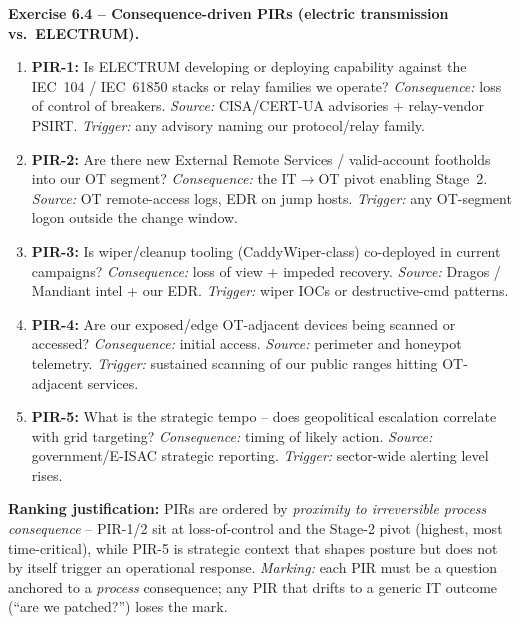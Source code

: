 \documentclass[11pt,a4paper]{article}
\begin{document}
\begin{solutionbox}
\textbf{Exercise 6.4 -- Consequence-driven PIRs (electric transmission vs.\ ELECTRUM).}\\[2pt]
\begin{enumerate}\setlength{\itemsep}{1pt}
  \item \textbf{PIR-1:} Is ELECTRUM developing or deploying capability against the IEC~104 /
        IEC~61850 stacks or relay families we operate? \emph{Consequence:} loss of control of
        breakers. \emph{Source:} CISA/CERT-UA advisories + relay-vendor PSIRT.
        \emph{Trigger:} any advisory naming our protocol/relay family.
  \item \textbf{PIR-2:} Are there new External Remote Services / valid-account footholds into
        our OT segment? \emph{Consequence:} the IT$\to$OT pivot enabling Stage~2.
        \emph{Source:} OT remote-access logs, EDR on jump hosts. \emph{Trigger:} any OT-segment
        logon outside the change window.
  \item \textbf{PIR-3:} Is wiper/cleanup tooling (CaddyWiper-class) co-deployed in current
        campaigns? \emph{Consequence:} loss of view + impeded recovery. \emph{Source:} Dragos /
        Mandiant intel + our EDR. \emph{Trigger:} wiper IOCs or destructive-cmd patterns.
  \item \textbf{PIR-4:} Are our exposed/edge OT-adjacent devices being scanned or accessed?
        \emph{Consequence:} initial access. \emph{Source:} perimeter and honeypot telemetry.
        \emph{Trigger:} sustained scanning of our public ranges hitting OT-adjacent services.
  \item \textbf{PIR-5:} What is the strategic tempo -- does geopolitical escalation correlate
        with grid targeting? \emph{Consequence:} timing of likely action. \emph{Source:}
        government/E-ISAC strategic reporting. \emph{Trigger:} sector-wide alerting level rises.
\end{enumerate}
\textbf{Ranking justification:} PIRs are ordered by \emph{proximity to irreversible process
consequence} -- PIR-1/2 sit at loss-of-control and the Stage-2 pivot (highest, most
time-critical), while PIR-5 is strategic context that shapes posture but does not by itself
trigger an operational response. \emph{Marking:} each PIR must be a question anchored to a
\emph{process} consequence; any PIR that drifts to a generic IT outcome (``are we patched?'')
loses the mark.
\end{solutionbox}
\end{document}
